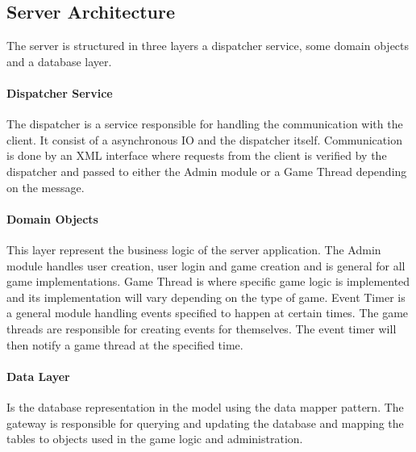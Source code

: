 \subsection{Server Architecture}\label{sec:server}
The server is structured in three layers a dispatcher service, some domain objects and a database layer. 

\paragraph{Dispatcher Service}
The dispatcher is a service responsible for handling the communication with the client. It consist of a asynchronous IO and the dispatcher itself. Communication is done by an XML interface where requests from the client is verified by the dispatcher and passed to either the Admin module or a Game Thread depending on the message. 

\paragraph{Domain Objects}
This layer represent the business logic of the server application. The Admin module handles user creation, user login and game creation and is general for all game implementations. Game Thread is where specific game logic is implemented and its implementation will vary depending on the type of game. Event Timer is a general module handling events specified to happen at certain times. The game threads are responsible for creating events for themselves. The event timer will then notify a game thread at the specified time.

\paragraph{Data Layer}
Is the database representation in the model using the data mapper pattern. The gateway is responsible for querying and updating the database and mapping the tables to objects used in the game logic and administration.

